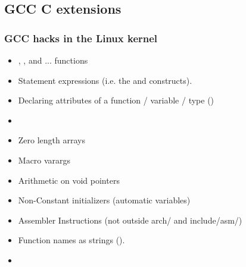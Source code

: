 \documentclass[xcolor=dvipsnames,compress]{beamer}
\begin{document}
\subsection*{GCC C extensions}
\begin{frame}[fragile]
\frametitle{GCC hacks in the Linux kernel}
\begin{itemize}
    \item {}, ,  and  ... functions 
    \item Statement expressions (i.e. the \structure{(\{} and \structure{\})} constructs).
    \item Declaring attributes of a function / variable / type ()
    \item {}
    \item Zero length arrays
    \item Macro varargs
    \item Arithmetic on void pointers
    \item Non-Constant initializers (automatic variables)
    \item Assembler Instructions (not outside arch/ and include/asm/) 
    \item Function names as strings ().
    \item {}
\end{itemize}
\end{frame}
\end{document}

